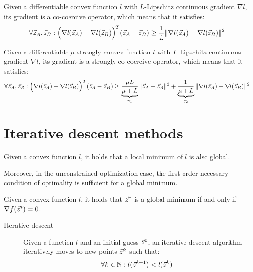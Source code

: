 \begin{lemma} 
    Given a differentiable convex function $l$ with $L$-Lipschitz continuous gradient $\nabla l$, its gradient is a co-coercive operator, which means that it satisfies:
    \[
        \forall {\vec{z}}_A, {\vec{z}}_B: \Big( \nabla l({\vec{z}}_A) - \nabla l({\vec{z}}_B) \Big)^T ({\vec{z}}_A - {\vec{z}}_B) \geq \frac{1}{L} \Vert \nabla l({\vec{z}}_A) - \nabla l({\vec{z}}_B) \Vert^2
    \]
\end{lemma}

\begin{lemma}  \label{th:strong_convex_lipschitz_gradient}
    Given a differentiable $\mu$-strongly convex function $l$ with $L$-Lipschitz continuous gradient $\nabla l$, its gradient is a strongly co-coercive operator, which means that it satisfies:
    \[
        \forall {\vec{z}}_A, {\vec{z}}_B: \Big( \nabla l({\vec{z}}_A) - \nabla l({\vec{z}}_B) \Big)^T ({\vec{z}}_A - {\vec{z}}_B) \geq \underbrace{\frac{\mu L}{\mu+L}}_{\gamma_1} \Vert {\vec{z}}_A - {\vec{z}}_B \Vert^2 + \underbrace{\frac{1}{\mu+L}}_{\gamma_2} \Vert \nabla l({\vec{z}}_A) - \nabla l({\vec{z}}_B) \Vert^2
    \]
\end{lemma}



\section{Iterative descent methods}

\begin{theorem}
    Given a convex function $l$, it holds that a local minimum of $l$ is also global.
    
    Moreover, in the unconstrained optimization case, the first-order necessary condition of optimality is sufficient for a global minimum.
\end{theorem}

\begin{theorem}
    Given a convex function $l$, it holds that ${\vec{z}}^*$ is a global minimum if and only if $\nabla f({\vec{z}}^*) = 0$.
\end{theorem}


\begin{description}
    \item[Iterative descent] 
        Given a function $l$ and an initial guess ${\vec{z}}^{0}$, an iterative descent algorithm iteratively moves to new points ${\vec{z}}^{k}$ such that:
        \[
            \forall k \in \mathbb{N}: l({\vec{z}}^{k+1}) < l({\vec{z}}^{k})
        \]
\end{description}


